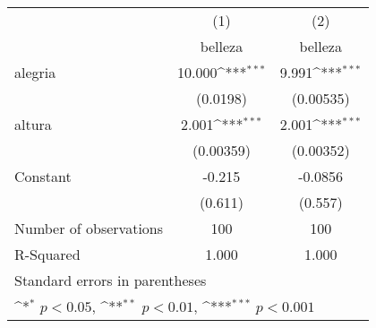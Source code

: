 {
\def\sym#1{\ifmmode^{#1}\else\(^{#1}\)\fi}
\begin{tabular}{l*{2}{c}}
\hline\hline
                    &\multicolumn{1}{c}{(1)}&\multicolumn{1}{c}{(2)}\\
                    &\multicolumn{1}{c}{belleza}&\multicolumn{1}{c}{belleza}\\
\hline
alegria             &      10.000\sym{***}&       9.991\sym{***}\\
                    &    (0.0198)         &   (0.00535)         \\
[1em]
altura              &       2.001\sym{***}&       2.001\sym{***}\\
                    &   (0.00359)         &   (0.00352)         \\
[1em]
Constant            &      -0.215         &     -0.0856         \\
                    &     (0.611)         &     (0.557)         \\
\hline
Number of observations&         100         &         100         \\
R-Squared           &       1.000         &       1.000         \\
\hline\hline
\multicolumn{3}{l}{\footnotesize Standard errors in parentheses}\\
\multicolumn{3}{l}{\footnotesize \sym{*} \(p<0.05\), \sym{**} \(p<0.01\), \sym{***} \(p<0.001\)}\\
\end{tabular}
}
